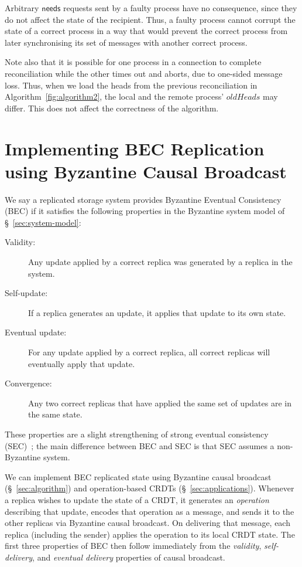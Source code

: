 \documentclass[a4paper,anonymous,USenglish]{lipics-v2019}
\begin{document}
Arbitrary $\mathsf{needs}$ requests sent by a faulty process have no consequence, since they do not affect the state of the recipient.
Thus, a faulty process cannot corrupt the state of a correct process in a way that would prevent the correct process from later synchronising its set of messages with another correct process.

Note also that it is possible for one process in a connection to complete reconciliation while the other times out and aborts, due to one-sided message loss.
Thus, when we load the heads from the previous reconciliation in Algorithm~\ref{fig:algorithm2}, the local and the remote process' $\mathit{oldHeads}$ may differ.
This does not affect the correctness of the algorithm.

\section{Implementing BEC Replication using Byzantine Causal Broadcast}\label{sec:byzantine-crdts}

We say a replicated storage system provides Byzantine Eventual Consistency (BEC) if it satisfies the following properties in the Byzantine system model of \S~\ref{sec:system-model}:

\begin{description}
\item[Validity:] Any update applied by a correct replica was generated by a replica in the system.
\item[Self-update:] If a replica generates an update, it applies that update to its own state.
\item[Eventual update:] For any update applied by a correct replica, all correct replicas will eventually apply that update.
\item[Convergence:] Any two correct replicas that have applied the same set of updates are in the same state.
\end{description}

These properties are a slight strengthening of strong eventual consistency (SEC)~\cite{Shapiro:2011}; the main difference between BEC and SEC is that SEC assumes a non-Byzantine system.

We can implement BEC replicated state using Byzantine causal broadcast (\S~\ref{sec:algorithm}) and operation-based CRDTs (\S~\ref{sec:applications}).
Whenever a replica wishes to update the state of a CRDT, it generates an \emph{operation} describing that update, encodes that operation as a message, and sends it to the other replicas via Byzantine causal broadcast.
On delivering that message, each replica (including the sender) applies the operation to its local CRDT state.
The first three properties of BEC then follow immediately from the \emph{validity}, \emph{self-delivery}, and \emph{eventual delivery} properties of causal broadcast.
\end{document}
